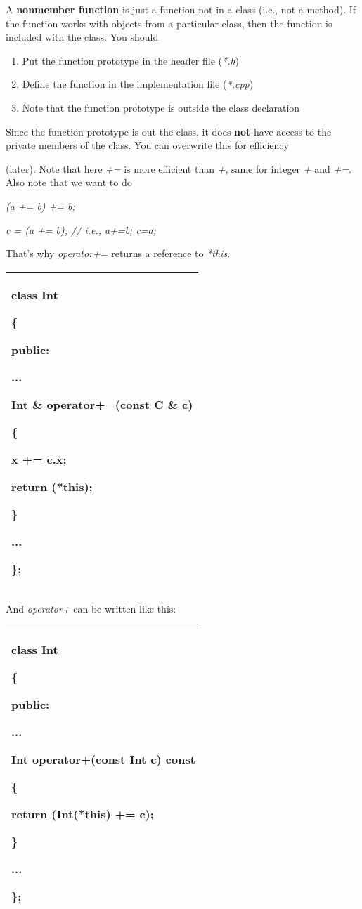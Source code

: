 \documentclass[
]{article}
\providecommand{\tightlist}{%
  \setlength{\itemsep}{0pt}\setlength{\parskip}{0pt}}
\begin{document}
A \textbf{nonmember function} is just a function not in a class (i.e.,
not a method). If the function works with objects from a particular
class, then the function is included with the class. You should

\begin{enumerate}
\def\labelenumi{\arabic{enumi}.}
\tightlist
\item
  Put the function prototype in the header file (\emph{*.h})
\item
  Define the function in the implementation file (\emph{*.cpp})
\item
  Note that the function prototype is outside the class declaration
\end{enumerate}

Since the function prototype is out the class, it does \textbf{not} have
access to the private members of the class. You can overwrite this for
efficiency

(later). Note that here \emph{+=} is more efficient than \emph{+}, same
for integer \emph{+} and \emph{+=}. Also note that we want to do

\emph{(a += b) += b; }

\emph{c = (a += b); // i.e., a+=b; c=a;}

That's why \emph{operator+=} returns a reference to \emph{*this}.

\begin{longtable}[]{@{}l@{}}
\toprule
\endhead
\begin{minipage}[t]{0.97\columnwidth}\raggedright
class Int

\{

public:

...

\textbf{Int \&} operator+=(const C \& c)

\{

x += c.x;

\textbf{ return (*this);}

\}

...

\};\strut
\end{minipage}\tabularnewline
\bottomrule
\end{longtable}

And \emph{operator+} can be written like this:

\begin{longtable}[]{@{}l@{}}
\toprule
\endhead
\begin{minipage}[t]{0.97\columnwidth}\raggedright
class Int

\{

public:

...

Int operator+(const Int c) const

\{

\textbf{return (Int(*this) += c);}

\}

...

\};\strut
\end{minipage}\tabularnewline
\bottomrule
\end{longtable}
\end{document}
